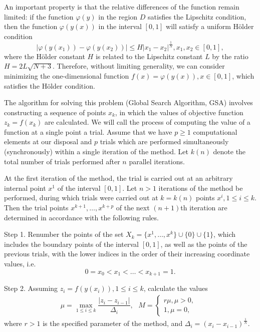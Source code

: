 \documentclass{svproc}
\begin{document}
An important property is that the relative differences of the function remain limited: if the function \(\varphi(y)\) in the region \(D\) satisfies the Lipschitz condition, then the function \(\varphi(y(x))\) in the interval \([0,1]\) will satisfy a uniform H{\"o}lder condition
\begin{displaymath}
\label{holder}
|\varphi(y(x_1))-\varphi(y(x_2))|\leqslant H{|x_1-x_2|}^{\frac{1}{N}}, x_1,x_2\in[0,1],
\end{displaymath}
where the H{\"o}lder constant \(H\) is related to the Lipschitz constant \(L\) by the ratio $ H=2L\sqrt{N+3}$. 
Therefore, without limiting generality, we can consider minimizing the one-dimensional function \(f(x)=\varphi(y(x)), x\in[0,1]\), which satisfies the H{\"o}lder condition.

The algorithm for solving this problem (Global Search Algorithm, GSA) involves constructing a sequence of points \(x_k\), in which the values of objective function \(z_k = f(x_k)\) are calculated. We will call the process of computing the value of a function at a single point a trial. Assume that we have \(p\geqslant 1\) computational elements at our disposal and \(p\) trials which are performed simultaneously (synchronously) within a single iteration of the method. Let \(k(n)\) denote the total number of trials performed after \(n\) parallel iterations.

At the first iteration of the method, the trial is carried out at an arbitrary internal point \(x^1\) of the interval \([0,1]\). Let \(n>1\) iterations of the method be performed, during which trials were carried out at \(k = k(n)\) points \(x^i, 1\leqslant i\leqslant k\). Then the trial points  \(x^{k+1},\dotsc,x^{k+p}\) of the next \((n+1)\)th iteration are determined in accordance with the following rules.

Step 1. Renumber the points of the set \(X_k=\{x^1,\dotsc,x^k\}\cup\{0\}\cup\{1\}\), which includes the boundary points of the interval \([0,1]\), as well as the points of the previous trials, with the lower indices in the order of their increasing coordinate values, i.e.
\begin{displaymath}
0=x_0<x_1<\dotsc<x_{k+1}=1.
\end{displaymath}

Step 2. Assuming \(z_i=f(y(x_i)),1\leqslant i\leqslant k\), calculate the values
\begin{displaymath}
\label{step2}
\mu=\max_{1\leqslant i\leqslant k}\dfrac{|z_i-z_{i-1}|}{\Delta_i}, \;
\begin{matrix}
    M = 
    \left\{
    \begin{matrix}
    r\mu,\mu>0, \\
    1,\mu=0,
    \end{matrix} \right.
    \end{matrix}
\end{displaymath}
where \(r > 1\) is the specified parameter of the method, and \(\Delta_i=(x_i-x_{i-1})^\frac{1}{N}\). 
\end{document}
